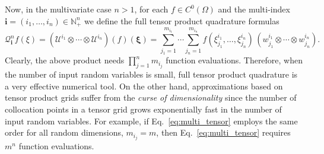 Now, in the multivariate case $n>1$, for each $f\in C^0(\Omega)$ and
the multi-index $\mathbf{i}=(i_1,\dots,i_n)\in\mathbb{N}_+^n$ we
define the full tensor product quadrature formulas
%
\begin{equation}\label{eq:multi_tensor}
\mathcal{Q}_{\mathbf{i}}^n f(\xi)=\left(\mathscr{U}^{i_1}\otimes\cdots\otimes\mathscr{U}^{i_n}\right)(f)(\boldsymbol{\xi})=
\sum_{j_1=1}^{m_{i_1}}\cdots\sum_{j_n=1}^{m_{i_n}}
f\left(\xi^{i_1}_{j_1},\dots , \xi^{i_n}_{j_n}\right)\,\left(w^{i_1}_{j_1}\otimes\cdots\otimes w^{i_n}_{j_n}\right).
\end{equation}
Clearly, the above product needs $\prod_{j=1}^n m_{i_j}$ function
evaluations.  Therefore, when the number of input random variables is
small, full tensor product quadrature is a very effective numerical
tool.  On the other hand, approximations based on tensor product grids
suffer from the \emph{curse of dimensionality} since the number of
collocation points in a tensor grid grows exponentially fast in the
number of input random variables.  For example, if
Eq.~\ref{eq:multi_tensor} employs the same order for all random dimensions,
$m_{i_j} = m$, then Eq.~\ref{eq:multi_tensor} requires $m^n$ function
evaluations.


